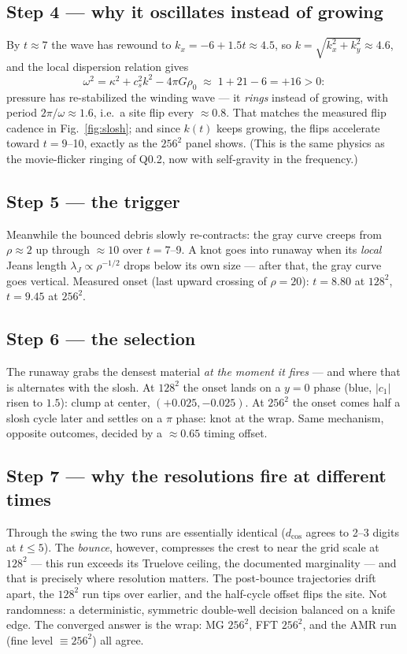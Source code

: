 \documentclass[11pt]{article}
\begin{document}
\subsection*{Step 4 --- why it oscillates instead of growing}
By $t \approx 7$ the wave has rewound to $k_x = -6 + 1.5t \approx 4.5$, so
$k = \sqrt{k_x^2 + k_y^2} \approx 4.6$, and the local dispersion relation gives
\begin{equation}
\omega^2 = \kappa^2 + c_s^2 k^2 - 4\pi G \rho_0 \;\approx\; 1 + 21 - 6 = +16 > 0 :
\end{equation}
pressure has re-stabilized the winding wave --- it \emph{rings} instead of growing,
with period $2\pi/\omega \approx 1.6$, i.e.\ a site flip every $\approx 0.8$. That
matches the measured flip cadence in Fig.~\ref{fig:slosh}; and since $k(t)$ keeps
growing, the flips accelerate toward $t = 9$--10, exactly as the $256^2$ panel
shows. (This is the same physics as the movie-flicker ringing of Q0.2, now with
self-gravity in the frequency.)

\subsection*{Step 5 --- the trigger}
Meanwhile the bounced debris slowly re-contracts: the gray curve creeps from
$\rho \approx 2$ up through $\approx 10$ over $t = 7$--9. A knot goes into runaway
when its \emph{local} Jeans length $\lambda_J \propto \rho^{-1/2}$ drops below its
own size --- after that, the gray curve goes vertical. Measured onset (last upward
crossing of $\rho = 20$): $t = 8.80$ at $128^2$, $t = 9.45$ at $256^2$.

\subsection*{Step 6 --- the selection}
The runaway grabs the densest material \emph{at the moment it fires} --- and where
that is alternates with the slosh. At $128^2$ the onset lands on a $y{=}0$ phase
(blue, $|c_1|$ risen to $1.5$): clump at center, $(+0.025, -0.025)$. At $256^2$ the
onset comes half a slosh cycle later and settles on a $\pi$ phase: knot at the
wrap. Same mechanism, opposite outcomes, decided by a $\approx 0.65$ timing offset.

\subsection*{Step 7 --- why the resolutions fire at different times}
Through the swing the two runs are essentially identical ($d_{\cos}$ agrees to 2--3
digits at $t \le 5$). The \emph{bounce}, however, compresses the crest to near the
grid scale at $128^2$ --- this run exceeds its Truelove ceiling, the documented
marginality --- and that is precisely where resolution matters. The post-bounce
trajectories drift apart, the $128^2$ run tips over earlier, and the half-cycle
offset flips the site. Not randomness: a deterministic, symmetric double-well
decision balanced on a knife edge. The converged answer is the wrap: MG $256^2$,
FFT $256^2$, and the AMR run (fine level $\equiv 256^2$) all agree.
\end{document}
